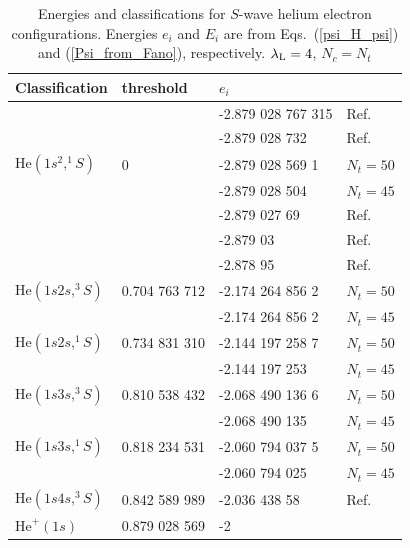 \documentclass[aip
, pra
, showpacs
, aps
, twocolumn
, groupedaddress
, floatfix
]{revtex4}
\begin{document}
\begin{table}[htb]
\caption{\label{Tab_ENGS}
Energies and classifications for $S$-wave helium electron configurations.
Energies $e_i$  and $E_i$ are from Eqs.~(\ref{psi_H_psi}) and (\ref{Psi_from_Fano}), respectively.
$\lambda_{\rm L}=4$, $N_c=N_t$
}
\begin{ruledtabular}
\begin{tabular}{llll}
Classification & threshold & $e_i$  &    \\
\hline
                      &    & -2.879 028 767 315 &  Ref. \cite{G94}    \\
                      &    & -2.879 028 732   &  Ref. \cite{JB97p2614}    \\
$\mbox{He}(1s^2,^1S)$ &  0 & -2.879 028 569 1 &  $N_t=50$   \\ %
                      &    & -2.879 028 504   &  $N_t=45$   \\
                      &    & -2.879 027 69    &  Ref. \cite{DHIF94}    \\
                      &    & -2.879 03        &  Ref. \cite{HMR05R}    \\
                      &    & -2.878 95        &  Ref. \cite{BS10p022715}    \\
\hline
$\mbox{He}(1s2s,^3S)$    & 0.704 763 712  & -2.174 264 856 2 & $N_t=50$ \\  %
                         &                & -2.174 264 856 2 & $N_t=45$ \\
\hline
$\mbox{He}(1s2s,^1S)$    & 0.734 831 310 & -2.144 197 258 7 &  $N_t=50$ \\
                         &               & -2.144 197 253   &  $N_t=45$   \\
\hline
$\mbox{He}(1s3s,^3S)$    & 0.810 538 432 & -2.068 490 136 6 & $N_t=50$  \\
                         &               & -2.068 490 135   & $N_t=45$\\
\hline
$\mbox{He}(1s3s,^1S)$    & 0.818 234 531 & -2.060 794 037 5 & $N_t=50$ \\
                         &               & -2.060 794 025   & $N_t=45$\\
\hline
$\mbox{He}(1s4s,^3S)$    & 0.842 589 989 & -2.036 438 58    & Ref. \cite{DHIF94} \\
\hline
$\mbox{He}^+(1s)$        & 0.879 028 569 & -2 	 &    \\
\end{tabular}
\end{ruledtabular}
\end{table}
\end{document}
